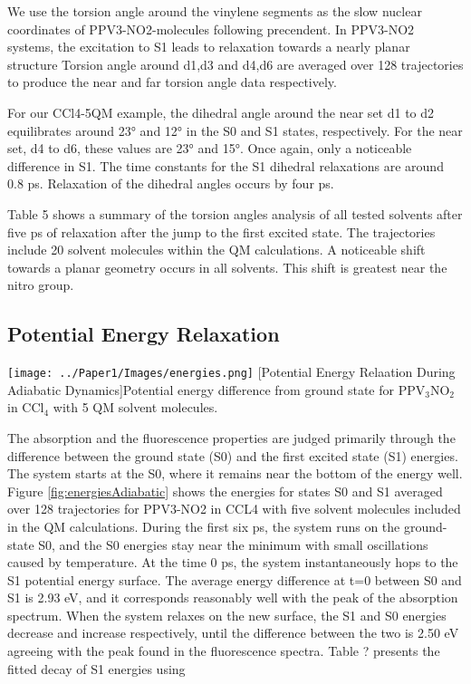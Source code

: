     We use the torsion angle around the vinylene segments as the slow nuclear coordinates of PPV3-NO2-molecules following precendent. \cite{Clark2012}
    In PPV3-NO2 systems, the excitation to S1 leads to relaxation towards a nearly planar structure Torsion angle around d1,d3 and d4,d6 are averaged over 128 trajectories to produce the near and far torsion angle data respectively. 

    For our CCl4-5QM example, the dihedral angle around the near set d1 to d2 equilibrates around 23° and 12° in the S0 and S1 states, respectively.
    For the near set, d4 to d6, these values are 23° and 15°.
    Once again, only a noticeable difference in S1.
    The time constants for the S1 dihedral relaxations are around 0.8 ps.
    Relaxation of the dihedral angles occurs by four ps. 

    Table 5 shows a summary of the torsion angles analysis of all tested solvents after five ps of relaxation after the jump to the first excited state.
    The trajectories include 20 solvent molecules within the QM calculations.
    A noticeable shift towards a planar geometry occurs in all solvents.
    This shift is greatest near the nitro group.

\subsection{Potential Energy Relaxation}

\noindent
\begin{minipage}[c]{\textwidth}
  \centering
  \texttt{[image: ../Paper1/Images/energies.png]}
  [Potential Energy Relaation During Adiabatic Dynamics]{Potential energy difference from ground state for PPV\(_3\)NO\(_2\) in CCl\(_4\) with 5 QM solvent molecules.}
  \label{fig:energiesAdiabatic}
\end{minipage}\bigskip

 The absorption and the fluorescence properties are judged primarily through the difference between the ground state (S0) and the first excited state (S1) energies.
 The system starts at the S0, where it remains near the bottom of the energy well.
 Figure \ref{fig:energiesAdiabatic} shows the energies for states S0 and S1 averaged over 128 trajectories for PPV3-NO2 in CCL4 with five solvent molecules included in the QM calculations.
 During the first six ps, the system runs on the ground-state S0, and the S0 energies stay near the minimum with small oscillations caused by temperature.
 At the time 0 ps, the system instantaneously hops to the S1 potential energy surface.
 The average energy difference at t=0 between S0 and S1 is 2.93 eV, and it corresponds reasonably well with the peak of the absorption spectrum.
 When the system relaxes on the new surface, the S1 and S0 energies decrease and increase respectively, until the difference between the two is 2.50 eV agreeing with the peak found in the fluorescence spectra.
 Table ? presents the fitted decay of S1 energies using   

